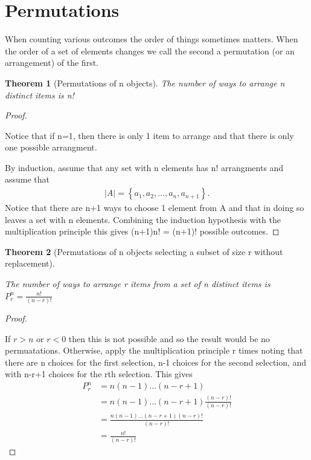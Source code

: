 \documentclass[10pt,]{book}
\theoremstyle{plain}
\newtheorem{theorem}{Theorem}[section]
\theoremstyle{definition}
\theoremstyle{definition}
\theoremstyle{definition}
\numberwithin{equation}{section}
\newcommand{\lt}{ < }
\newcommand{\gt}{ > }
\begin{document}
\section[Permutations]{Permutations}\label{section-14}
When counting various outcomes the order of things sometimes matters. When the order of a set of elements changes we call the second a permutation (or an arrangement) of the first.%
\begin{theorem}[Permutations of n objects]\label{theorem-10}
The number of ways to arrange n distinct items is n!\end{theorem}
\begin{proof}\hypertarget{proof-7}{}
Notice that if n=1, then there is only 1 item to arrange and 
			that there is only one possible arrangment.%
\par

			By induction, assume that any set with n elements has n! arrangments 
			and assume that 
			\begin{gather*}
|A| = \left \{ a_1, a_2, ... , a_n, a_{n+1} \right \}.
\end{gather*}
			Notice that there are n+1 ways to choose 1 element from A and that in doing so leaves a set with n elements. Combining the induction hypothesis with the multiplication principle this gives (n+1)n! = (n+1)! possible outcomes.
\end{proof}
\begin{theorem}[Permutations of n objects selecting a subset of size r without replacement]\label{theorem-11}
 
			The number of ways to arrange r items from a set of n distinct items 
			is \( P_r^n = \frac{n!}{(n-r)!} \)
\end{theorem}
\begin{proof}\hypertarget{proof-8}{}

			If \(r \gt n\) or \(r \lt 0 \) then this is not possible and so the result would be no permuatations. Otherwise, apply the multiplication principle r times noting that there are 
			n choices for the first selection, n-1 choices for the second
			selection, and with n-r+1 choices for the rth selection. This gives
			\begin{align*}
P_r^n & = n(n-1) ... (n-r+1)\\
& = n(n-1) ... (n-r+1)\frac{(n-r)!}{(n-r)!}\\
& = \frac{n(n-1) ... (n-r+1)(n-r)!}{(n-r)!}\\
& = \frac{n!}{(n-r)!}
\end{align*}
\end{proof}
\end{document}
